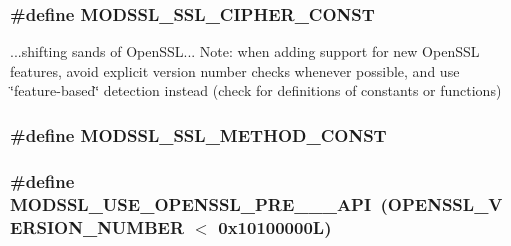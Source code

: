 \subsubsection[{\texorpdfstring{M\+O\+D\+S\+S\+L\+\_\+\+S\+S\+L\+\_\+\+C\+I\+P\+H\+E\+R\+\_\+\+C\+O\+N\+ST}{MODSSL_SSL_CIPHER_CONST}}]{\setlength{\rightskip}{0pt plus 5cm}\#define M\+O\+D\+S\+S\+L\+\_\+\+S\+S\+L\+\_\+\+C\+I\+P\+H\+E\+R\+\_\+\+C\+O\+N\+ST}\hypertarget{group__MOD__SSL__PRIVATE_ga7b6280feb97f6cd5c78fc4e8dd5b655a}{}\label{group__MOD__SSL__PRIVATE_ga7b6280feb97f6cd5c78fc4e8dd5b655a}
...shifting sands of Open\+S\+SL... Note\+: when adding support for new Open\+S\+SL features, avoid explicit version number checks whenever possible, and use \char`\"{}feature-\/based\char`\"{} detection instead (check for definitions of constants or functions) 
\subsubsection[{\texorpdfstring{M\+O\+D\+S\+S\+L\+\_\+\+S\+S\+L\+\_\+\+M\+E\+T\+H\+O\+D\+\_\+\+C\+O\+N\+ST}{MODSSL_SSL_METHOD_CONST}}]{\setlength{\rightskip}{0pt plus 5cm}\#define M\+O\+D\+S\+S\+L\+\_\+\+S\+S\+L\+\_\+\+M\+E\+T\+H\+O\+D\+\_\+\+C\+O\+N\+ST}\hypertarget{group__MOD__SSL__PRIVATE_ga76b4e09ab4f53af78ef366f667c9de01}{}\label{group__MOD__SSL__PRIVATE_ga76b4e09ab4f53af78ef366f667c9de01}
\subsubsection[{\texorpdfstring{M\+O\+D\+S\+S\+L\+\_\+\+U\+S\+E\+\_\+\+O\+P\+E\+N\+S\+S\+L\+\_\+\+P\+R\+E\+\_\+1\+\_\+1\+\_\+\+A\+PI}{MODSSL_USE_OPENSSL_PRE_1_1_API}}]{\setlength{\rightskip}{0pt plus 5cm}\#define M\+O\+D\+S\+S\+L\+\_\+\+U\+S\+E\+\_\+\+O\+P\+E\+N\+S\+S\+L\+\_\+\+P\+R\+E\+\_\+\_\+\_\+\+A\+PI~(O\+P\+E\+N\+S\+S\+L\+\_\+\+V\+E\+R\+S\+I\+O\+N\+\_\+\+N\+U\+M\+B\+ER $<$ 0x10100000\+L)}\hypertarget{group__MOD__SSL__PRIVATE_gaab591417d0b8b2190c357d9be6ecad23}{}\label{group__MOD__SSL__PRIVATE_gaab591417d0b8b2190c357d9be6ecad23}
